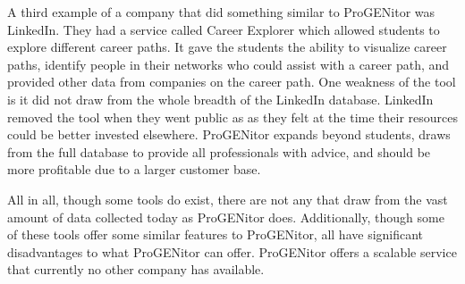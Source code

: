 A third example of a company that did something similar to ProGENitor was
LinkedIn.  They had a service called Career Explorer\cite{careerexplorer} which
allowed students to explore different career paths.  It gave the students the
ability to visualize career paths, identify people in their networks who could
assist with a career path, and provided other data from companies on the career
path.  One weakness of the tool is it did not draw from the whole breadth of the
LinkedIn database.  LinkedIn removed the tool when they went public as as they
felt at the time their resources could be better invested elsewhere.
\cite{liresources}  ProGENitor expands beyond students, draws from the full
database to provide all professionals with advice, and should be more profitable
due to a larger customer base.

All in all, though some tools do exist, there are not any that draw from the
vast amount of data collected today as ProGENitor does.  Additionally, though
some of these tools offer some similar features to ProGENitor, all have
significant disadvantages to what ProGENitor can offer.  ProGENitor offers a
scalable service that currently no other company has available.
